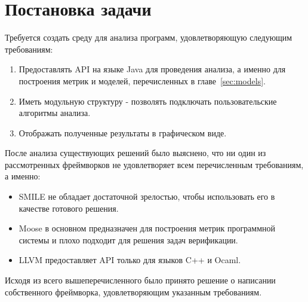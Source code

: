 \section{Постановка задачи} %

Требуется создать среду для анализа программ, удовлетворяющую следующим
требованиям:

\begin{enumerate}
    \item Предоставлять API на языке Java для проведения анализа, а именно для
    построения метрик и моделей, перечисленных в главе~\ref{sec:models}.
    \item Иметь модульную структуру - позволять подключать пользовательские
    алгоритмы анализа.
    \item Отображать полученные результаты в графическом виде.
\end{enumerate}

После анализа существующих решений было выяснено, что ни один из рассмотренных
фреймворков не удовлетворяет всем перечисленным требованиям, а именно:

\begin{itemize}
    \item SMILE не обладает достаточной зрелостью, чтобы использовать его в
    качестве готового решения.
    \item Moose в основном предназначен для построения метрик программной
    системы и плохо подходит для решения задач верификации.
    \item LLVM предоставляет API только для языков C++ и Ocaml.
\end{itemize}

Исходя из всего вышеперечисленного было принято решение о написании собственного
фреймворка, удовлетворяющим указанным требованиям.
